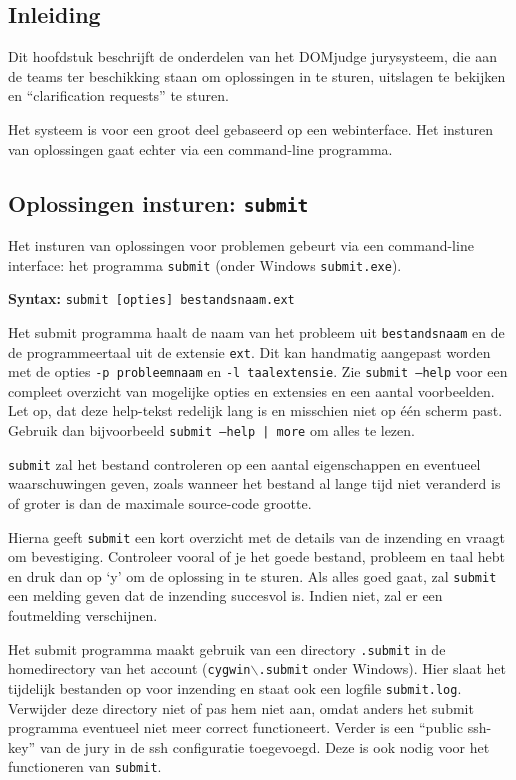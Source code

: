 \documentclass[11pt,titlepage,a4paper]{article}
\newcommand{\DOMjudge}{DOMjudge }
\begin{document}
\subsection{Inleiding}

Dit hoofdstuk beschrijft de onderdelen van het \DOMjudge
jurysysteem, die aan de teams ter beschikking staan om oplossingen in
te sturen, uitslagen te bekijken en ``clarification requests'' te
sturen.

Het systeem is voor een groot deel gebaseerd op een webinterface. Het
insturen van oplossingen gaat echter via een command-line programma.

\subsection{Oplossingen insturen: \texttt{submit}}\label{submit}

Het insturen van oplossingen voor problemen gebeurt via een
command-line interface: het programma \texttt{submit} (onder Windows
\texttt{submit.exe}).

\textbf{Syntax:} \texttt{submit [opties] bestandsnaam.ext}

Het submit programma haalt de naam van het probleem uit
\texttt{bestandsnaam} en de de programmeertaal uit de extensie
\texttt{ext}. Dit kan handmatig aangepast worden met de opties
\texttt{-p probleemnaam} en \texttt{-l taalextensie}. Zie
\texttt{submit --help} voor een compleet overzicht van mogelijke
opties en extensies en een aantal voorbeelden. Let op, dat deze help-tekst
redelijk lang is en misschien niet op \'e\'en scherm past. Gebruik dan
bijvoorbeeld \texttt{submit --help | more} om alles te lezen.

\texttt{submit} zal het bestand controleren op een aantal eigenschappen
en eventueel waarschuwingen geven, zoals wanneer het bestand al lange
tijd niet veranderd is of groter is dan de maximale source-code grootte.

Hierna geeft \texttt{submit} een kort overzicht met de details van de
inzending en vraagt om bevestiging. Controleer vooral of je het goede
bestand, probleem en taal hebt en druk dan op `y' om de oplossing in
te sturen. Als alles goed gaat, zal \texttt{submit} een melding geven
dat de inzending succesvol is. Indien niet, zal er een foutmelding
verschijnen.

Het submit programma maakt gebruik van een directory \texttt{.submit}
in de homedirectory van het account (\texttt{cygwin$\backslash$.submit}
onder Windows). Hier slaat het tijdelijk
bestanden op voor inzending en staat ook een logfile \texttt{submit.log}.
Verwijder deze directory niet of pas hem niet aan, omdat anders het
submit programma eventueel niet meer correct functioneert. Verder
is een ``public ssh-key'' van de jury in de ssh configuratie
toegevoegd. Deze is ook nodig voor het functioneren van \texttt{submit}.
 
\end{document}
